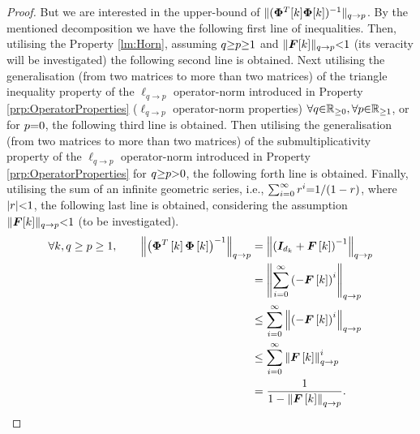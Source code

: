 \begin{proof}
But we are interested in the upper-bound of $\Vert (\boldsymbol{\Phi}^T[k] \boldsymbol{\Phi}[k])^{-1} \Vert_{q \to p}$.
By the mentioned decomposition we have the following first line of inequalities.
Then, utilising the Property \ref{lm:Horn}, assuming $q {\geq} p {\geq} 1$ and $\Vert \boldsymbol{F} [k] \Vert_{q \to p} {<} 1$ (its veracity will be investigated) the following second line is obtained.
Next utilising the generalisation (from two matrices to more than two matrices) of the triangle inequality property of the $\ell_{q {\to} p}$ operator-norm introduced in Property \ref{prp:OperatorProperties} ($\ell_{q {\to} p}$ operator-norm properties) $\forall q {\in} \mathbb{R}_{{\geq} 0} , \forall p {\in} \mathbb{R}_{{\geq} 1}$, or for $p {=} 0$, the following third line is obtained.
Then utilising the generalisation (from two matrices to more than two matrices) of the submultiplicativity property of the $\ell_{q {\to} p}$ operator-norm introduced in Property \ref{prp:OperatorProperties} for $q {\geq} p {>} 0$, the following forth line is obtained. 
Finally, utilising the sum of an infinite geometric series, i.e., $\sum_{i {=} 0}^{\infty} r ^i {=} 1 /(1 - r)$, where $|r| {<} 1$, the following last line is obtained, considering the assumption $\Vert\boldsymbol{F}[k] \Vert_{q \to p} {<} 1$ (to be investigated).
\begin{equation}
\label{eq:UB-invPhik} 
\begin{aligned}
\forall k, q \geq p \geq 1, \qquad
\left\lVert\left( \boldsymbol{\Phi}^T \left[ k \right] \boldsymbol{\Phi} \left[ k \right] \right)^{-1}\right\rVert_{q \to p} &= 
\left\lVert\left( \boldsymbol{I}_{d_k} + \boldsymbol{F}\left[ k \right] \right)^{-1}\right\rVert_{q \to p} \\
&= \left\lVert\displaystyle\sum_{i=0}^\infty \left( -\boldsymbol{F}\left[ k \right] \right)^i\right\rVert_{q \to p} \\
&\leq \displaystyle\sum_{i=0}^\infty \left\lVert\left( -\boldsymbol{F}\left[ k \right] \right)^i\right\rVert_{q \to p} \\
&\leq \displaystyle\sum_{i=0}^\infty \left\lVert\boldsymbol{F}\left[ k \right]\right\rVert_{q \to p}^i \\
&= \frac{1}{1-\left\lVert\boldsymbol{F}\left[ k \right]\right\rVert_{q \to p}}.
\end{aligned}
\end{equation}


\end{proof}
